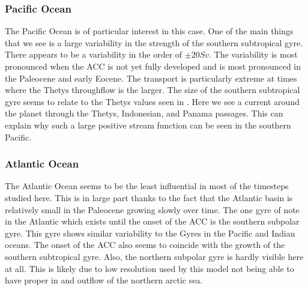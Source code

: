 \subsubsection{Pacific Ocean}
The Pacific Ocean is of particular interest in this case. One of the main things that we see is a large variability in the strength of the southern subtropical gyre. There appears to be a variability in the order of $\pm 20 Sv$.  The variability is most pronounced when the ACC is not yet fully developed and is most pronounced in the Paleocene and early Eocene. The transport is particularly extreme at times where the Thetys throughflow is the larger. The size of the southern subtropical gyre seems to relate to the Thetys values seen in . Here we see a current around the planet through the Thetys, Indonesian, and Panama passages. This can explain why such a large positive stream function can be seen in the southern Pacific.

\subsubsection{Atlantic Ocean}
The Atlantic Ocean seems to be the least influential in most of the timesteps studied here. This is in large part thanks to the fact that the Atlantic basin is relatively small in the Paleocene growing slowly over time. The one gyre of note in the Atlantic which exists until the onset of the ACC is the southern subpolar gyre. This gyre shows similar variability to the Gyres in the Pacific and Indian oceans. The onset of the ACC also seems to coincide with the growth of the southern subtropical gyre. Also, the northern subpolar gyre is hardly visible here at all. This is likely due to low resolution used by this model not being able to have proper in and outflow of the northern arctic sea.


